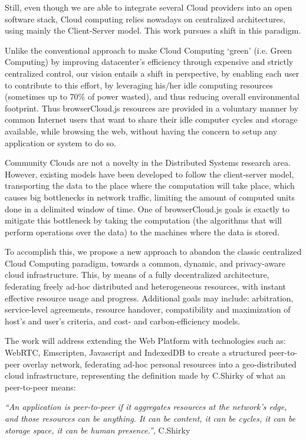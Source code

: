 Still, even though we are able to integrate several Cloud providers into an open software stack, Cloud computing relies nowadays on centralized architectures, using mainly the Client-Server model. This work pursues a shift in this paradigm.

Unlike the conventional approach to make Cloud Computing `green' (i.e. Green Computing) by improving datacenter's efficiency through expensive and strictly centralized control, our vision entails a shift in perspective, by enabling each user to contribute to this effort, by leveraging his/her idle computing resources (sometimes up to 70\% of power wasted), and thus reducing overall environmental footprint. Thus browserCloud.js resources are provided in a voluntary manner by common Internet users that want to share their idle computer cycles and storage available, while browsing the web, without having the concern to setup any application or system to do so.

Community Clouds are not a novelty in the Distributed Systems research area. However, existing models have been developed to follow the client-server model, transporting the data to the place where the computation will take place, which causes big bottlenecks in network traffic, limiting the amount of computed units done in a delimited window of time. One of browserCloud.js goals is exactly to mitigate this bottleneck by taking the computation (the algorithms that will perform operations over the data) to the machines where the data is stored.

To accomplish this, we propose a new approach to abandon the classic centralized Cloud Computing paradigm, towards a common, dynamic, and privacy-aware cloud infrastructure. This, by means of a fully decentralized architecture, federating freely ad-hoc distributed and heterogeneous resources, with instant effective resource usage and progress. Additional goals may include: arbitration, service-level agreements, resource handover, compatibility and maximization of host's and user's criteria, and cost- and carbon-efficiency models.

The work will address extending the Web Platform with technologies such as: WebRTC, Emscripten, Javascript and IndexedDB to create a structured peer-to-peer overlay network, federating ad-hoc personal resources into a geo-distributed cloud infrastructure, representing the definition made by C.Shirky of what an peer-to-peer means:

  \textit{``An application is peer-to-peer if it aggregates resources at the network’s edge, and those resources can be anything. It can be content, it can be cycles, it can be storage space, it can be human presence.''}, C.Shirky \cite{Shirky.}

